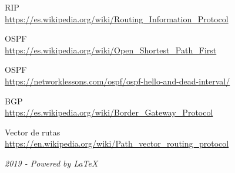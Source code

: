 \begin{thebibliography}{9}
\bibitem{} 
RIP
\\\url{https://es.wikipedia.org/wiki/Routing\_Information\_Protocol}

\bibitem{} 
OSPF
\\\url{https://es.wikipedia.org/wiki/Open\_Shortest\_Path\_First}

\bibitem{} 
OSPF
\\\url{https://networklessons.com/ospf/ospf-hello-and-dead-interval/}

\bibitem{} 
BGP
\\\url{https://es.wikipedia.org/wiki/Border\_Gateway\_Protocol}

\bibitem{} 
Vector de rutas
\\\url{https://en.wikipedia.org/wiki/Path\_vector\_routing\_protocol}

\end{thebibliography}
\begin{center}
\textit{2019 - Powered by \LaTeX\  } 
\end{center}